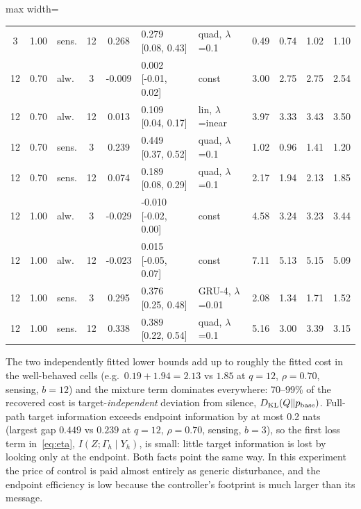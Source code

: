 \documentclass[10pt]{article}
\newcommand{\KL}{D_{\mathrm{KL}}}
\begin{document}
\begin{table}[htbp]
\begin{adjustbox}{max width=\textwidth}
\begin{tabular}{cclc c l l cc cc}
3 & 1.00 & sens. & 12 & 0.268 & 0.279 [0.08, 0.43] & quad, $\lambda$=0.1 & 0.49 & 0.74 & 1.02 & 1.10 \\
12 & 0.70 & alw. & 3 & -0.009 & 0.002 [-0.01, 0.02] & const & 3.00 & 2.75 & 2.75 & 2.54 \\
12 & 0.70 & alw. & 12 & 0.013 & 0.109 [0.04, 0.17] & lin, $\lambda$=inear & 3.97 & 3.33 & 3.43 & 3.50 \\
12 & 0.70 & sens. & 3 & 0.239 & 0.449 [0.37, 0.52] & quad, $\lambda$=0.1 & 1.02 & 0.96 & 1.41 & 1.20 \\
12 & 0.70 & sens. & 12 & 0.074 & 0.189 [0.08, 0.29] & quad, $\lambda$=0.1 & 2.17 & 1.94 & 2.13 & 1.85 \\
12 & 1.00 & alw. & 3 & -0.029 & -0.010 [-0.02, 0.00] & const & 4.58 & 3.24 & 3.23 & 3.44 \\
12 & 1.00 & alw. & 12 & -0.023 & 0.015 [-0.05, 0.07] & const & 7.11 & 5.13 & 5.15 & 5.09 \\
12 & 1.00 & sens. & 3 & 0.295 & 0.376 [0.25, 0.48] & GRU-4, $\lambda$=0.01 & 2.08 & 1.34 & 1.71 & 1.52 \\
12 & 1.00 & sens. & 12 & 0.338 & 0.389 [0.22, 0.54] & quad, $\lambda$=0.1 & 5.16 & 3.00 & 3.39 & 3.15 \\
\bottomrule
\end{tabular}
\end{adjustbox}
\end{table}

The two independently fitted lower bounds add up to roughly the fitted cost in the well-behaved cells (e.g.\ $0.19+1.94=2.13$ vs $1.85$ at $q=12$, $\rho=0.70$, sensing, $b=12$) and the mixture term dominates everywhere: 70--99\% of the recovered cost is target-\emph{independent} deviation from silence, $\KL(Q\Vert p_{\rm base})$. Full-path target information exceeds endpoint information by at most 0.2 nats (largest gap $0.449$ vs $0.239$ at $q=12$, $\rho=0.70$, sensing, $b=3$), so the first loss term in~\eqref{eq:eta}, $I(Z;\Gamma_h\mid Y_h)$, is small: little target information is lost by looking only at the endpoint. Both facts point the same way. In this experiment the price of control is paid almost entirely as generic disturbance, and the endpoint efficiency is low because the controller's footprint is much larger than its message.
\end{document}
